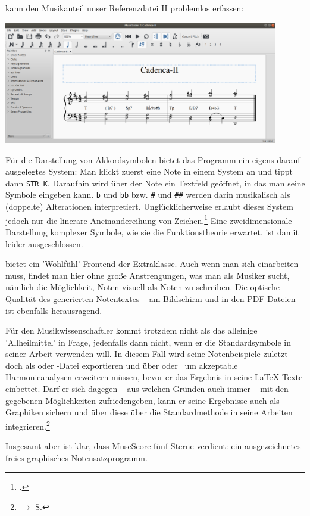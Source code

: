 kann den Musikanteil unser Referenzdatei II problemlos erfassen:

\begin{center}
\includegraphics[width=0.9\textwidth]{frontends/musescore/cadenca2-musescore-300dpi.png}
\end{center}

Für die Darstellung von Akkordsymbolen bietet das Programm ein eigens darauf
ausgelegtes System: Man klickt zuerst eine Note in einem System an und tippt
dann \texttt{STR K}. Daraufhin wird über der Note ein Textfeld geöffnet, in das
man seine Symbole eingeben kann. \texttt{b} und \texttt{bb} bzw. \texttt{\#} und
\texttt{\#\#} werden darin musikalisch als (doppelte) Alterationen
interpretiert. Unglücklicherweise erlaubt dieses System jedoch nur die linerare
Aneinandereihung von Zeichen.\footcite[vgl.][\nopage wp]{MuseScore2019i} Eine
zweidimensionale Darstellung komplexer Symbole, wie sie die Funktionstheorie
erwartet, ist damit leider ausgeschlossen.

 bietet ein 'Wohlfühl'-Frontend der Extraklasse. Auch wenn man
sich einarbeiten muss, findet man hier ohne große Anstrengungen, was man als
Musiker sucht, nämlich die Möglichkeit, Noten visuell als Noten zu schreiben.
Die optische Qualität des generierten Notentextes -- am Bildschirm und in den
PDF-Dateien -- ist ebenfalls herausragend. 

Für den Musikwissenschaftler kommt  trotzdem nicht als das
alleinige 'Allheilmittel' in Frage, jedenfalls dann nicht, wenn er die
Standardsymbole in seiner Arbeit verwenden will. In diesem Fall  wird seine
Notenbeispiele zuletzt doch als  oder -Datei
exportieren und über  oder  \ um akzeptable
Harmonieanalysen erweitern müssen, bevor er das Ergebnis in seine \LaTeX-Texte
einbettet. Darf er sich dagegen -- aus welchen Gründen auch immer -- mit den
gegebenen Möglichkeiten zufriedengeben, kann er seine Ergebnisse auch als
Graphiken sichern und über diese über die Standardmethode in seine Arbeiten
integrieren.\footnote{$\rightarrow$ S. \pageref{IncludeGraphics}}

Insgesamt aber ist klar, dass MuseScore fünf Sterne verdient: ein
ausgezeichnetes freies graphisches Notensatzprogramm.
%

